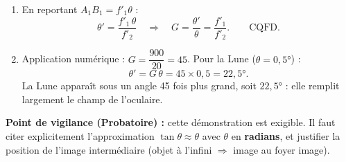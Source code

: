 \documentclass[11pt]{article}
\begin{document}
\begin{corrige}
\begin{enumerate}
\[ \tan\theta' = \dfrac{A_1B_1}{f'_2} \quad \Longrightarrow \quad \theta' \approx \dfrac{A_1B_1}{f'_2} \quad (\text{petits angles}). \]
\item En reportant $A_1B_1 = f'_1\theta$ :
\[ \theta' = \dfrac{f'_1\,\theta}{f'_2} \quad \Longrightarrow \quad G = \dfrac{\theta'}{\theta} = \dfrac{f'_1}{f'_2}. \qquad \text{CQFD.} \]
\item Application numérique : $G = \dfrac{900}{20} = 45$. Pour la Lune ($\theta = 0{,}5°$) :
\[ \theta' = G\,\theta = 45 \times 0{,}5 = 22{,}5°. \]
La Lune apparaît sous un angle 45 fois plus grand, soit $22{,}5°$ : elle remplit largement le champ de l'oculaire.
\end{enumerate}
\textbf{Point de vigilance (Probatoire) :} cette démonstration est exigible. Il faut citer explicitement l'approximation $\tan\theta \approx \theta$ avec $\theta$ en \textbf{radians}, et justifier la position de l'image intermédiaire (objet à l'infini $\Rightarrow$ image au foyer image).
\end{corrige}
\end{document}
